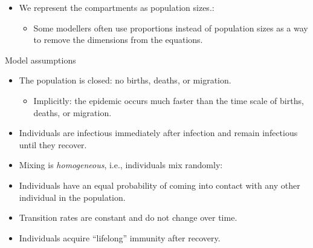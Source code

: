 \documentclass[
  ignorenonframetext,
]{beamer}
\providecommand{\tightlist}{%
  \setlength{\itemsep}{0pt}\setlength{\parskip}{0pt}}\usepackage{longtable,booktabs,array}
\begin{document}
\begin{frame}
\begin{tcolorbox}[enhanced jigsaw, toprule=.15mm, opacityback=0, bottomtitle=1mm, opacitybacktitle=0.6, colframe=quarto-callout-note-color-frame, titlerule=0mm, breakable, colback=white, title={Note}, left=2mm, colbacktitle=quarto-callout-note-color!10!white, arc=.35mm, coltitle=black, bottomrule=.15mm, rightrule=.15mm, leftrule=.75mm, toptitle=1mm]

\begin{itemize}
\tightlist
\item
  We represent the compartments as {population sizes}.:

  \begin{itemize}
  \tightlist
  \item
    Some modellers often use {proportions} instead of population sizes
    as a way to remove the dimensions from the equations.
  \end{itemize}
\end{itemize}

\end{tcolorbox}
\end{frame}

\begin{frame}
\begin{block}{Model assumptions}
\label{model-assumptions}
\begin{itemize}
\tightlist
\item
  The population is closed: no births, deaths, or migration.

  \begin{itemize}
  \tightlist
  \item
    Implicitly: the epidemic occurs much faster than the time scale of
    births, deaths, or migration.
  \end{itemize}
\item
  Individuals are infectious immediately after infection and remain
  infectious until they recover.
\end{itemize}
\end{block}
\end{frame}

\begin{frame}
\begin{itemize}
\item
  Mixing is \emph{homogeneous}, i.e., {individuals mix randomly}:
\item
  Individuals have an equal probability of coming into contact with any
  other individual in the population.
\item
  Transition rates are constant and do not change over time.
\item
  Individuals acquire ``lifelong'' immunity after recovery.
\end{itemize}

\end{frame}
\end{document}
